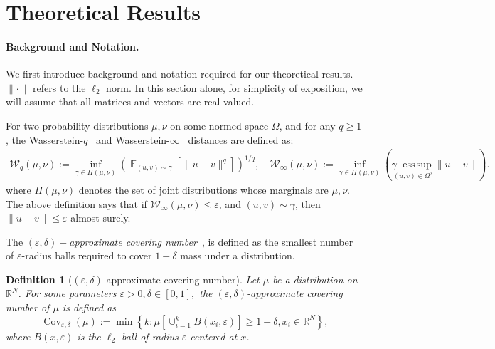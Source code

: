 \documentclass{article}
\newtheorem{definition}[theorem]{Definition}
\newcommand{\norm}[1]{\|#1\|}
\newcommand{\eps}{\varepsilon}
\newcommand{\R}{\mathbb{R}}
\DeclareMathOperator*{\E}{\mathbb{E}}
\DeclareMathOperator{\esssup}{ess\,sup}
\newcommand{\cW}{\mathcal W}
\DeclareMathOperator{\cov}{Cov}
\begin{document}
\section{Theoretical Results}\label{sec:theory}
\paragraph{Background and Notation.}
We first introduce background and notation required for our theoretical results. $\norm{\cdot}$ refers to the $\ell_2$ norm. In this section alone, for simplicity of exposition, we will assume that all matrices and vectors are real valued.  

For two probability distributions $\mu, \nu$ on some normed space $\Omega$, and for any $q\geq 1$, the Wasserstein-$q$~\cite{villani2008optimal, arjovsky2017wasserstein} and Wasserstein-$\infty$~\cite{champion2008wasserstein} distances are defined as:
\begin{align*}
  \cW_q ( \mu, \nu) := \inf_{\gamma \in \Pi(\mu,\nu)} \left( \E_{(u,v)
  \sim \gamma} \left[ \norm{ u - v}^q \right] \right)^{1/q}, \quad
  \cW_{\infty}(\mu,\nu) := \inf_{\gamma \in \Pi(\mu,\nu)} \left(
    \underset{{(u,v) \in \Omega^2}}{\gamma\text{-}\esssup} \norm{u - v}
\right).
\end{align*}
where $\Pi(\mu,\nu)$ denotes the set of joint distributions whose
marginals are $\mu,\nu$.
The above definition says that if $\cW_{\infty}(\mu,\nu)\leq \eps$,
and $(u,v) \sim \gamma$, then $\norm{u-v} \leq \eps$ almost surely.

The $(\eps, \delta)-$\emph{approximate
covering number}~\cite{jalal2021instance}, is defined as the smallest
number of $\eps$-radius balls required to cover $1-\delta$ mass under
a distribution.  
\begin{definition}[$(\eps,\delta)$-approximate covering number]
  Let $\mu$ be a distribution on $\R^N$. For some parameters
  $\eps > 0,
  \delta\in \left[ 0,1 \right],$ the \emph{$(\eps,\delta)$-approximate
  covering number} of $\mu$ is defined as
  \[
    \cov_{\eps,\delta}(\mu) := \min\left\{ k :  \mu\left[ \cup_{i=1}^k
    B(x_i,\eps)  \right]\geq 1 - \delta, x_i \in \R^N  \right\},
  \]
  where $B(x, \eps)$ is the $\ell_2$ ball of radius $\eps$ centered
  at $x$.
\end{definition}\label{defn: cov}
\end{document}
